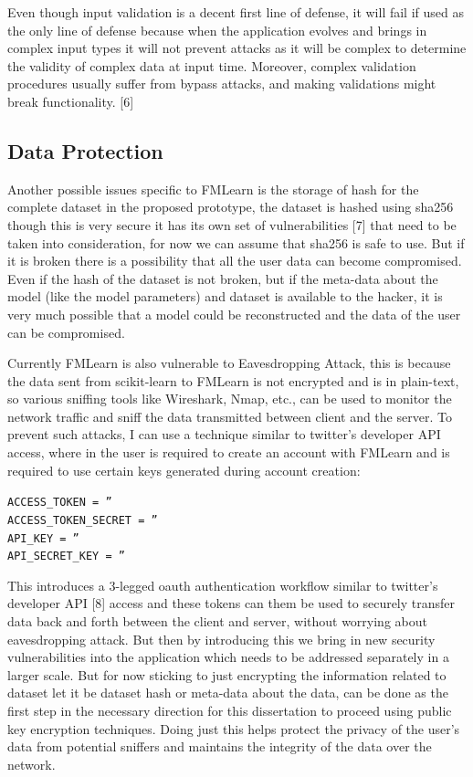 Even though input validation is a decent first line of defense, it will fail if used as the only line of defense because when the application evolves and brings in complex input types it will not prevent attacks as it will be complex to determine the validity of complex data at input time. Moreover, complex validation procedures usually suffer from bypass attacks, and making validations might break functionality. [6]

\subsection{Data Protection}
Another possible issues specific to FMLearn is the storage of hash for the complete dataset in the proposed prototype, the dataset is hashed using sha256 though this is very secure it has its own set of vulnerabilities [7] that need to be taken into consideration, for now we can assume that sha256 is safe to use. But if it is broken there is a possibility that all the user data can become compromised. Even if the hash of the dataset is not broken, but if the meta-data about the model (like the model parameters) and dataset is available to the hacker, it is very much possible that a model could be reconstructed and the data of the user can be compromised.

Currently FMLearn is also vulnerable to Eavesdropping Attack, this is because the data sent from scikit-learn to FMLearn is not encrypted and is in plain-text, so various sniffing tools like Wireshark, Nmap, etc., can be used to monitor the network traffic and sniff the data transmitted between client and the server. To prevent such attacks, I can use a technique similar to twitter’s developer API access, where in the user is required to create an account with FMLearn and is required to use certain keys generated during account creation:

\quad\quad\quad\quad\quad\quad\quad\quad\quad\quad\quad\quad\quad\quad
\texttt{ACCESS\_TOKEN = ''\\}
\quad\quad\quad\quad\quad\quad\quad\quad\quad\quad\quad\quad\quad\quad
\texttt{ACCESS\_TOKEN\_SECRET = ''\\}
\quad\quad\quad\quad\quad\quad\quad\quad\quad\quad\quad\quad\quad\quad
\texttt{API\_KEY = ''\\}
\quad\quad\quad\quad\quad\quad\quad\quad\quad\quad\quad\quad\quad\quad
\texttt{API\_SECRET\_KEY = ''}

This introduces a 3-legged oauth authentication workflow similar to twitter’s developer API [8] access and these tokens can them be used to securely transfer data back and forth between the client and server, without worrying about eavesdropping attack. But then by introducing this we bring in new security vulnerabilities into the application which needs to be addressed separately in a larger scale. But for now sticking to just encrypting the information related to dataset let it be dataset hash or meta-data about the data, can be done as the first step in the necessary direction for this dissertation to proceed using public key encryption techniques. Doing just this helps protect the privacy of the user’s data from potential sniffers and maintains the integrity of the data over the network.


